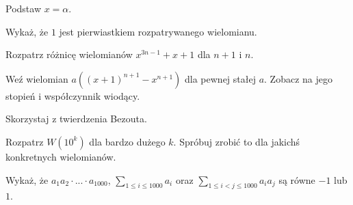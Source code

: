 
\begin{hints_list}
	\item Podstaw $x = \alpha$.
	\item Wykaż, że $1$ jest pierwiastkiem rozpatrywanego wielomianu.
	\item Rozpatrz różnicę wielomianów $x^{3n - 1} + x + 1$ dla $n + 1$ i $n$.
	\item Weź wielomian $a\left((x + 1)^{n + 1} - x^{n + 1} \right)$ dla pewnej stałej $a$. Zobacz na jego stopień i współczynnik wiodący.
	\item Skorzystaj z twierdzenia Bezouta.
	\item Rozpatrz $W(10^k)$ dla bardzo dużego $k$. Spróbuj zrobić to dla jakichś konkretnych wielomianów.
	\item Wykaż, że $a_1a_2 \cdot ... \cdot a_{1000}$, $\sum_{1 \leqslant i \leqslant 1000} a_i$ oraz $\sum_{1 \leqslant i < j \leqslant 1000} a_ia_j$ są równe $-1$ lub $1$.
\end{hints_list}